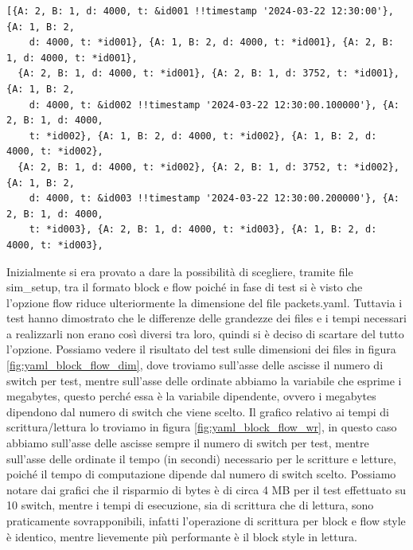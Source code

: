 \documentclass[binding=0.6cm]{sapthesis}
\begin{document}
{\scriptsize %
\begin{lstlisting}[caption={Rappresentazione di un pacchetto con descrizione completa}, label={codice:long_description_packet}, breaklines=true]
[{A: 2, B: 1, d: 4000, t: &id001 !!timestamp '2024-03-22 12:30:00'}, {A: 1, B: 2,
    d: 4000, t: *id001}, {A: 1, B: 2, d: 4000, t: *id001}, {A: 2, B: 1, d: 4000, t: *id001},
  {A: 2, B: 1, d: 4000, t: *id001}, {A: 2, B: 1, d: 3752, t: *id001}, {A: 1, B: 2,
    d: 4000, t: &id002 !!timestamp '2024-03-22 12:30:00.100000'}, {A: 2, B: 1, d: 4000,
    t: *id002}, {A: 1, B: 2, d: 4000, t: *id002}, {A: 1, B: 2, d: 4000, t: *id002},
  {A: 2, B: 1, d: 4000, t: *id002}, {A: 2, B: 1, d: 3752, t: *id002}, {A: 1, B: 2,
    d: 4000, t: &id003 !!timestamp '2024-03-22 12:30:00.200000'}, {A: 2, B: 1, d: 4000,
    t: *id003}, {A: 2, B: 1, d: 4000, t: *id003}, {A: 1, B: 2, d: 4000, t: *id003},
\end{lstlisting}
}
Inizialmente si era provato a dare la possibilità di scegliere, tramite file sim\_setup, 
tra il formato block e flow poiché in fase di test
si è visto che l'opzione flow riduce ulteriormente la dimensione del file packets.yaml. Tuttavia i test hanno dimostrato che le differenze delle grandezze
dei files e i tempi necessari a realizzarli non erano così diversi tra loro, quindi si è deciso di scartare del tutto l'opzione. Possiamo vedere
il risultato del test sulle dimensioni dei files in figura \ref{fig:yaml_block_flow_dim}, dove troviamo sull'asse delle ascisse il numero di switch per test, mentre
sull'asse delle ordinate abbiamo la variabile che esprime i megabytes, questo perché essa è la variabile dipendente, ovvero i megabytes dipendono dal numero di switch
che viene scelto. Il grafico relativo ai tempi di scrittura/lettura lo troviamo in 
figura \ref{fig:yaml_block_flow_wr}, in questo caso abbiamo sull'asse delle ascisse sempre il numero di switch per test, mentre sull'asse delle ordinate
il tempo (in secondi) necessario per le scritture e letture, poiché il tempo di computazione dipende dal numero di switch scelto. Possiamo notare dai grafici che il risparmio di bytes è di circa 4 MB per il test effettuato su 10 switch, mentre
i tempi di esecuzione, sia di scrittura che di lettura, sono praticamente sovrapponibili, infatti l'operazione di scrittura per block e flow style è identico, mentre lievemente
più performante è il block style in lettura.
\end{document}

